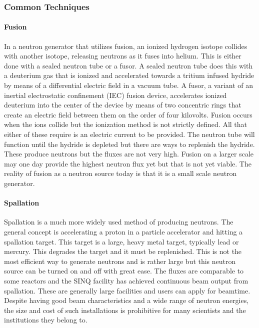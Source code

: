 \subsubsection{Common Techniques}
\paragraph{Fusion}
In a neutron generator that utilizes fusion, an ionized hydrogen isotope collides with another isotope, releasing neutrons as it fuses into helium. This is either done with a sealed neutron tube or a fusor. A sealed neutron tube does this with a deuterium gas that is ionized and accelerated towards a tritium infused hydride by means of a differential electric field in a vacuum tube. A fusor, a variant of an inertial electrostatic confinement (IEC) fusion device, accelerates ionized deuterium into the center of the device by means of two concentric rings that create an electric field between them on the order of four kilovolts. Fusion occurs when the ions collide but the ionization method is not strictly defined. All that either of these require is an electric current to be provided. The neutron tube will function until the hydride is depleted but there are ways to replenish the hydride. These produce neutrons but the fluxes are not very high. Fusion on a larger scale may one day provide the highest neutron flux yet but that is not yet viable. The reality of fusion as a neutron source today is that it is a small scale neutron generator.\\
\paragraph{Spallation}
Spallation is a much more widely used method of producing neutrons. The general concept is accelerating a proton in a particle accelerator and hitting a spallation target. This target is a large, heavy metal target, typically lead or mercury. This degrades the target and it must be replenished. This is not the most efficient way to generate neutrons and is rather large but this neutron source can be turned on and off with great ease. The fluxes are comparable to some reactors and the SINQ facility has achieved continuous beam output from spallation. These are generally large facilities and users can apply for beamtime. Despite having good beam characteristics and a wide range of neutron energies, the size and cost of such installations is prohibitive for many scientists and the institutions they belong to.\\
